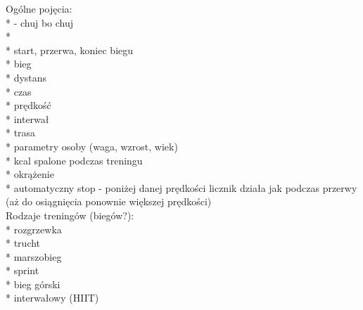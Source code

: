 Ogólne pojęcia:\\
	*  - chuj bo chuj\\
	* \\
	* start, przerwa, koniec biegu\\
	* bieg\\
	* dystans\\
	* czas\\
	* prędkość\\
	* interwał\\
	* trasa\\
	* parametry osoby (waga, wzrost, wiek)\\
	* kcal spalone podczas treningu\\
	* okrążenie\\
	* automatyczny stop - poniżej danej prędkości licznik działa jak podczas przerwy (aż do osiągnięcia ponownie większej prędkości)\\

Rodzaje treningów (biegów?):\\
	* rozgrzewka\\
	* trucht\\
	* marszobieg\\
	* sprint\\
	* bieg górski\\
	* interwałowy (HIIT)\\

